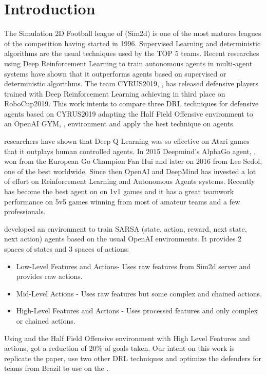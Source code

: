 \chapter{Introduction}
The Simulation 2D Football league of \cite{robocup} (Sim2d) is one of the most matures leagues of the competition having started in 1996. Supervised Learning and deterministic algorithms are the usual techniques used by the TOP 5 teams. Recent researches using Deep Reinforcement Learning to train autonomous agents in multi-agent systems have shown that it outperforms agents based on supervised or deterministic algorithms. The team CYRUS2019, \cite{cyrus}, has released defensive players trained with Deep Reinforcement Learning achieving in third place on RoboCup2019. This work intents to compare three DRL techniques for defensive agents based on CYRUS2019 adapting the Half Field Offensive environment to an OpenAI GYM, \cite{gym}, environment and apply the best technique on \cite{robocin} agents.

\cite{deepmind} researchers \cite{dqn} have shown that Deep Q Learning was so effective on Atari games that it outplays human controlled agents. In 2015 Deepmind's AlphaGo agent, \cite{alphago}, won from the European Go Champion Fan Hui and later on 2016 from Lee Sedol, one of the best worldwide. Since then OpenAI and DeepMind has invested a lot of effort on Reinforcement Learning and Autonomous Agents systems. Recently \cite{openai5} has become the best agent on \cite{dota2} on 1v1 games and it has a great teamwork performance on 5v5 games winning from most of amateur teams and a few professionals.

\cite{hfo} developed an environment to train SARSA (state, action, reward, next state, next action) agents based on the usual OpenAI environments. It provides 2 spaces of states and 3 spaces of actions:
\begin{itemize}
    \item Low-Level Features and Actions- Uses raw features from Sim2d server and provides raw actions.
    \item Mid-Level Actions - Uses raw features but some complex and chained actions.
    \item High-Level Features and Actions - Uses processed features and only complex or chained actions.
\end{itemize}
Using \cite{DDPG} and the Half Field Offensive environment with High Level Features and actions, \cite{cyrus} got a reduction of 20\% of goals taken. Our intent on this work is replicate the paper, use two other DRL techniques and optimize the defenders for teams from Brazil to use on the \cite{larc}.